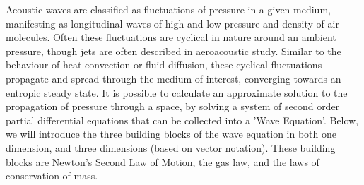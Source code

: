 Acoustic waves are classified as fluctuations of pressure in a given medium, manifesting as longitudinal waves of high and low pressure and density of air molecules. Often these fluctuations are cyclical in nature around an ambient pressure, though jets are often described in aeroacoustic study. Similar to the behaviour of heat convection or fluid diffusion, these cyclical fluctuations propagate and spread through the medium of interest, converging towards an entropic steady state. It is possible to calculate an approximate solution to the propagation of pressure through a space, by solving a system of second order partial differential equations that can be collected into a 'Wave Equation'. Below, we will introduce the three building blocks of the wave equation in both one dimension, and three dimensions (based on vector notation). These building blocks are Newton's Second Law of Motion, the gas law, and the laws of conservation of mass.\\


